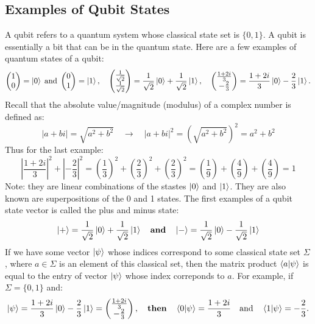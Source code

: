 \documentclass[11pt]{scrartcl}
\begin{document}
\subsection{Examples of Qubit States}
A qubit refers to a quantum system whose classical state set is $\{0, 1\}$. A qubit is essentially a bit that can be in the quantum state.
Here are a few examples of quantum states of a qubit:
\[
\begin{pmatrix}
1 \\
0
\end{pmatrix}
= \ket{0} \; \text{and} \;
\begin{pmatrix}
0 \\
1
\end{pmatrix}
= \ket{1}, \quad
\begin{pmatrix}
\frac{1}{\sqrt{2}} \\
\frac{1}{\sqrt{2}}
\end{pmatrix}
= \frac{1}{\sqrt{2}} \ket{0} + \frac{1}{\sqrt{2}} \ket{1},\quad
\begin{pmatrix}
	\frac{1 + 2i}{3} \\
	-\frac{2}{3}
	\end{pmatrix}
	= \frac{1 + 2i}{3} \ket{0} - \frac{2}{3} \ket{1}.
	\]
Recall that the absolute value/magnitude (modulus) of a complex number is defined as:
$$|a + bi| = \sqrt{a^2 + b^2} \quad \rightarrow \quad |a + bi|^2 = \left(\sqrt{a^2 + b^2}\right)^2 = a^2 + b^2$$
Thus for the last example:
$$ {\left|\frac{1 + 2i}{3}\right|}^2 + {\left|-\frac{2}{3}\right|}^2 = \left(\frac{1}{3}\right)^2 + \left(\frac{2}{3}\right)^2 + \left(\frac{2}{3}\right)^2 = \left(\frac{1}{9}\right) + \left(\frac{4}{9}\right) + \left(\frac{4}{9}\right) = 1$$
Note: they are linear combinations of the stastes $\ket{0}$ and $\ket{1}$. They are also known are superpositions of the 0 and 1 states.\vspace{2mm}
\newline
The first examples of a qubit state vector is called the plus and minus state:
$$\ket{+} = \frac{1}{\sqrt{2}}\ket{0} + \frac{1}{\sqrt{2}}\ket{1}\quad \textbf{and} \quad\ket{-} = \frac{1}{\sqrt{2}}\ket{0} - \frac{1}{\sqrt{2}}\ket{1}$$
If we have some vector $\ket{\psi}$ whose indices correspond to some classical state set $\Sigma$, where $a\in\Sigma$ is an 
element of this classical set, then the matrix product $\braket{a|\psi}$ is equal to the entry of vector $\ket{\psi}$
whose index correponds to $a$.\vspace{2mm}
For example, if $\Sigma = \{0, 1\}$ and:
\[
\ket{\psi} = \frac{1 + 2i}{3} \ket{0} - \frac{2}{3} \ket{1} = \begin{pmatrix} \frac{1 + 2i}{3} \\ -\frac{2}{3} \end{pmatrix},
\quad \textbf{then} \quad
\braket{0 | \psi} = \frac{1 + 2i}{3} \quad \text{and} \quad \braket{1 | \psi} = -\frac{2}{3}.
\]
\end{document}

